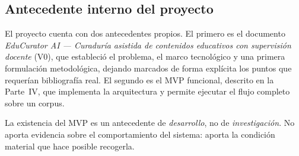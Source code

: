 \subsection{Antecedente interno del proyecto}
\label{sec:ant-interno}

El proyecto cuenta con dos antecedentes propios. El primero es el documento
\emph{EduCurator AI --- Curaduría asistida de contenidos educativos con supervisión
docente} (V0), que estableció el problema, el marco tecnológico y una primera
formulación metodológica, dejando marcados de forma explícita los puntos que
requerían bibliografía real. El segundo es el MVP funcional, descrito en la
Parte~IV, que implementa la arquitectura y permite ejecutar el flujo completo sobre
un corpus.

\begin{advertencia}
La existencia del MVP es un antecedente de \emph{desarrollo}, no de
\emph{investigación}. No aporta evidencia sobre el comportamiento del sistema: aporta
la condición material que hace posible recogerla.
\end{advertencia}
